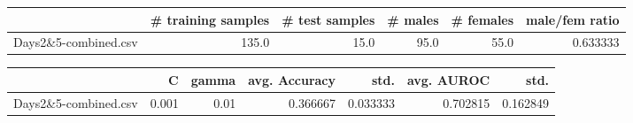 \begin{tabular}{lrrrrr}
\hline
{} &  \# training samples &  \# test samples &  \# males &  \# females &  male/fem ratio \\
\hline
Days2\&5-combined.csv &               135.0 &            15.0 &     95.0 &       55.0 &        0.633333 \\
\hline
\end{tabular}
\begin{tabular}{lrrrrrr}
\hline
{} &      C &  gamma &  avg. Accuracy &      std. &  avg. AUROC &      std. \\
\hline
Days2\&5-combined.csv &  0.001 &   0.01 &       0.366667 &  0.033333 &    0.702815 &  0.162849 \\
\hline
\end{tabular}
